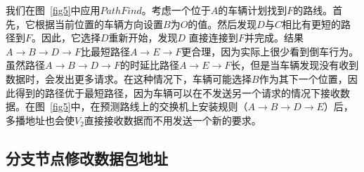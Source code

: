 \documentclass{ctexart}
\begin{document}

我们在图~\ref{fig5}中应用$PathFind$。考虑一个位于$A$的车辆计划找到$F$的路线。首先，它根据当前位置的车辆方向设置$B$为$O$的值。然后发现$D$与$C$相比有更短的路径到$F$。因此，它选择$D$重新开始，发现$D$
直接连接到$F$并完成。结果$ A \to B \to D \to F $比最短路径$ A \to E \to F $更合理，因为实际上很少看到倒车行为。虽然路径$ A \to B \to D \to F $的时延比路径$ A \to E \to F $长，但是当车辆发现没有收到数据时，会发出更多请求。在这种情况下，车辆可能选择$B$作为其下一个位置，因此得到的路径优于最短路径，因为车辆可以在不发送另一个请求的情况下接收数据。在图~\ref{fig5}中，在预测路线上的交换机上安装规则（$ A \to B \to D \to E $）后，多播地址也会使$V_{2}$直接接收数据而不用发送一个新的要求。
%
%



\subsection{分支节点修改数据包地址} \label{Modify address}
\end{document}
